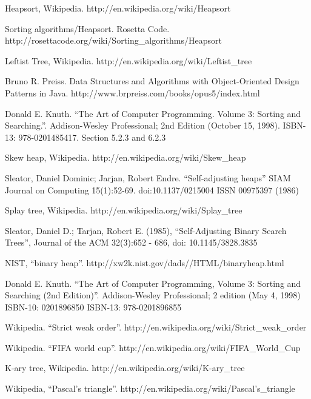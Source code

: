 \documentclass[UTF8]{article}
\begin{document}
\begin{thebibliography}{99}
Heapsort, Wikipedia. http://en.wikipedia.org/wiki/Heapsort

Sorting algorithms/Heapsort. Rosetta Code. http://rosettacode.org/wiki/Sorting\_algorithms/Heapsort

Leftist Tree, Wikipedia. http://en.wikipedia.org/wiki/Leftist\_tree

Bruno R. Preiss. Data Structures and Algorithms with Object-Oriented Design Patterns in Java. http://www.brpreiss.com/books/opus5/index.html

Donald E. Knuth. ``The Art of Computer Programming. Volume 3: Sorting and Searching.''. Addison-Wesley Professional;
2nd Edition (October 15, 1998). ISBN-13: 978-0201485417. Section 5.2.3 and 6.2.3

Skew heap, Wikipedia. http://en.wikipedia.org/wiki/Skew\_heap

Sleator, Daniel Dominic; Jarjan, Robert Endre. ``Self-adjusting heaps'' SIAM Journal on Computing 15(1):52-69. doi:10.1137/0215004 ISSN 00975397 (1986)

Splay tree, Wikipedia. http://en.wikipedia.org/wiki/Splay\_tree

Sleator, Daniel D.; Tarjan, Robert E. (1985), ``Self-Adjusting Binary Search Trees'', Journal of the ACM 32(3):652 - 686, doi: 10.1145/3828.3835

NIST, ``binary heap''. http://xw2k.nist.gov/dads//HTML/binaryheap.html

Donald E. Knuth. ``The Art of Computer Programming, Volume 3: Sorting and Searching (2nd Edition)''. Addison-Wesley Professional; 2 edition (May 4, 1998) ISBN-10: 0201896850 ISBN-13: 978-0201896855

Wikipedia. ``Strict weak order''. http://en.wikipedia.org/wiki/Strict\_weak\_order

Wikipedia. ``FIFA world cup''. http://en.wikipedia.org/wiki/FIFA\_World\_Cup

K-ary tree, Wikipedia. http://en.wikipedia.org/wiki/K-ary\_tree

Wikipedia, ``Pascal's triangle''. http://en.wikipedia.org/wiki/Pascal's\_triangle


\end{thebibliography}
\end{document}
